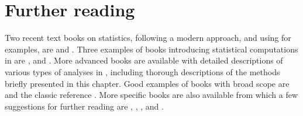 \documentclass[krantz2]{krantz}\usepackage{knitr}
\begin{document}

%
%
%

\section{Further reading}\label{sec:stat:further:reading}

Two recent text books on statistics, following a modern approach, and using \Rlang for examples, are  \autocite{Diez2019} and  \autocite{Holmes2019}. Three examples of books introducing statistical computations in \Rlang are  \autocite{Dalgaard2008},  \autocite{Everitt2010} and  \autocite{Zuur2009}. More advanced books are available with detailed descriptions of various types of analyses in \Rlang, including thorough descriptions of the methods briefly presented in this chapter. Good examples of books with broad scope are  \autocite{Crawley2012} and the classic reference  \autocite{Venables2002}. More specific books are also available from which a few suggestions for further reading are  \autocite{Everitt2011},  \autocite{Faraway2004},  \autocite{Faraway2006},  \autocite{Pinheiro2000} and  \autocite{Wood2017}.









\backmatter

\printbibliography

\printindex\label{idx:general}

\printindex[rindex]\label{idx:rindex}

\printindex[rcatsidx]\label{idx:rcats}

\printindex[faqindex]\label{idx:faqindex}
\end{document}
